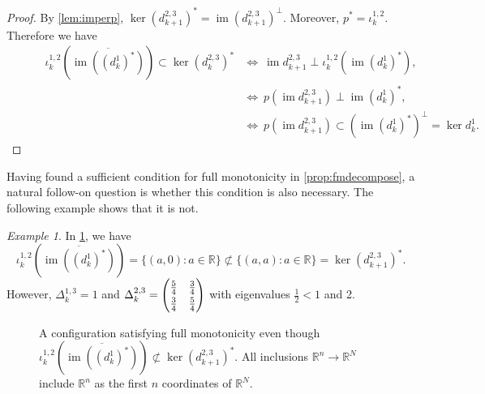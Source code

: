 \documentclass[11pt]{article}
\theoremstyle{definition}
\theoremstyle{remark}
\newtheorem{example}[theorem]{Example}
\DeclareMathOperator{\im}{im}
\newcommand{\R}{\mathbb{R}}
\begin{document}
    \begin{proof}
        By \cref{lem:imperp}, $\ker(d_{k+1}^{2,3})^*=\im(d_{k+1}^{2,3})^\perp$. Moreover, $p^*=\iota_k^{1,2}$. Therefore we have
        \begin{align*}
            \qquad\quad\iota_k^{1,2} \left(\overline{\im((d_k^1)^*)}\right) \subset \ker(d_k^{2,3})^*
            &\Leftrightarrow \ \im d^{2,3}_{k+1}\perp \iota^{1,2}_k(\im (d^1_k)^*),\\
            &\Leftrightarrow \ p(\im d^{2,3}_{k+1})\perp\im (d^1_k)^*,\\
            &\Leftrightarrow \ p(\im d^{2,3}_{k+1})\subset (\im (d^1_k)^*)^\perp=\ker d^1_k.
        \end{align*}
    \end{proof}
Having found a sufficient condition for full monotonicity in \cref{prop:fmdecompose}, a natural follow-on question is whether this condition is also necessary. The following example shows that it is not.
\begin{example}
    In \cref{fig:fmnoimker}, we have 
    $$
    \iota_k^{1,2} \left(\overline{\im((d_k^1)^*)}\right) = \{(a,0): a \in \R\}\not \subset \{(a,a):a \in \R\}= \ker(d_{k+1}^{2,3})^*.
    $$
    However, $\Delta_k^{1,3}=1$ and $\Delta_k^{2,3}=\renewcommand*{\arraystretch}{1.2}\begin{pmatrix}
        \frac 5 4 & \frac 3 4 \\ \frac 3 4 & \frac 5 4  
    \end{pmatrix}$ with eigenvalues $\frac 1 2 < 1 $ and 2.
\end{example}
\begin{figure}[H]
    \centering
\caption{A configuration satisfying full monotonicity even though $\iota_k^{1,2} \left(\overline{\im((d_k^1)^*)}\right) \not \subset \ker(d_{k+1}^{2,3})^*$. All inclusions $\R^n \to \R^N$ include $\R^n$ as the first $n$ coordinates of $\R^N$.}
\label{fig:fmnoimker}
    \end{figure}
\end{document}
